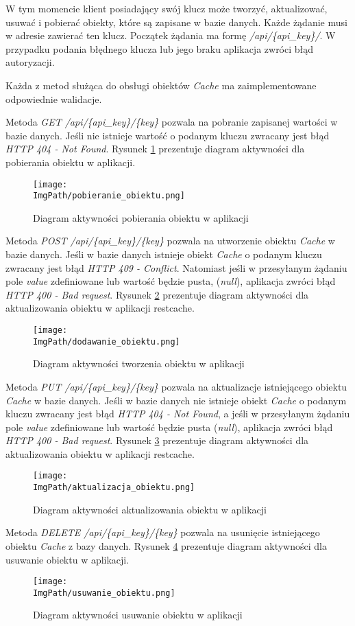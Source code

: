 W tym momencie klient posiadający swój klucz może tworzyć, aktualizować, usuwać i pobierać obiekty, które są zapisane w bazie danych. Każde żądanie  musi w adresie zawierać ten klucz. Początek żądania ma formę \textsl{/api/\{api\_key\}/}. W przypadku podania błędnego klucza lub jego braku aplikacja zwróci błąd autoryzacji. 

Każda z metod służąca do obsługi obiektów \textsl{Cache} ma zaimplementowane odpowiednie walidacje. 

Metoda \textsl{GET /api/\{api\_key\}/\{key\}} pozwala na pobranie zapisanej wartości w bazie danych. Jeśli nie istnieje wartość o podanym kluczu zwracany jest błąd \textsl{HTTP 404 - Not Found}. Rysunek \ref{fig:pobieranie_obiektu} prezentuje diagram aktywności dla pobierania obiektu w aplikacji.
\begin{figure}[!ht]
\centering
\texttt{[image: \\ImgPath/pobieranie\_obiektu.png]}
\caption{Diagram aktywności pobierania obiektu w aplikacji}
\label{fig:pobieranie_obiektu}
\end{figure}

Metoda \textsl{POST /api/\{api\_key\}/\{key\}} pozwala na utworzenie obiektu \textsl{Cache} w bazie danych. Jeśli w bazie danych istnieje obiekt \textsl{Cache} o podanym kluczu zwracany jest błąd \textsl{HTTP 409 - Conflict}. Natomiast jeśli w przesyłanym żądaniu pole \textsl{value} zdefiniowane lub wartość będzie pusta, (\textsl{null}), aplikacja zwróci błąd \textsl{HTTP 400 - Bad request}.  Rysunek \ref{fig:tworzenie_obiektu} prezentuje diagram aktywności dla aktualizowania obiektu w aplikacji restcache.
\begin{figure}[!ht]
\centering
\texttt{[image: \\ImgPath/dodawanie\_obiektu.png]}
\caption{Diagram aktywności tworzenia obiektu w aplikacji}
\label{fig:tworzenie_obiektu}
\end{figure}

Metoda \textsl{PUT /api/\{api\_key\}/\{key\}} pozwala na aktualizacje istniejącego obiektu \textsl{Cache} w bazie danych. Jeśli w bazie danych  nie istnieje obiekt \textsl{Cache} o podanym kluczu zwracany jest błąd \textsl{HTTP 404 - Not Found}, a  jeśli w przesyłanym żądaniu pole \textsl{value} zdefiniowane lub wartość będzie pusta (\textsl{null}), aplikacja zwróci błąd \textsl{HTTP 400 - Bad request}. Rysunek \ref{fig:aktualizowanie_obiektu} prezentuje diagram aktywności dla aktualizowania obiektu w aplikacji restcache.
\begin{figure}[!ht]
\centering
\texttt{[image: \\ImgPath/aktualizacja\_obiektu.png]}
\caption{Diagram aktywności aktualizowania obiektu w aplikacji}
\label{fig:aktualizowanie_obiektu}
\end{figure}
Metoda \textsl{DELETE /api/\{api\_key\}/\{key\}} pozwala na usunięcie istniejącego obiektu \textsl{Cache} z bazy danych. Rysunek \ref{fig:usuwanie_obiektu} prezentuje diagram aktywności dla usuwanie obiektu w aplikacji.
\begin{figure}[!ht]
\centering
\texttt{[image: \\ImgPath/usuwanie\_obiektu.png]}
\caption{Diagram aktywności usuwanie obiektu w aplikacji}
\label{fig:usuwanie_obiektu}
\end{figure}

